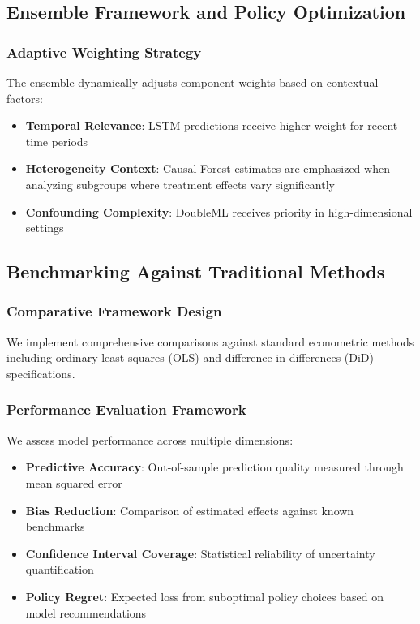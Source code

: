 \subsection{Ensemble Framework and Policy Optimization}\label{subsec:hybrid}

\subsubsection{Adaptive Weighting Strategy}
The ensemble dynamically adjusts component weights based on contextual factors:
\begin{itemize}
    \item \textbf{Temporal Relevance}: LSTM predictions receive higher weight for recent time periods
    \item \textbf{Heterogeneity Context}: Causal Forest estimates are emphasized when analyzing subgroups where treatment effects vary significantly
    \item \textbf{Confounding Complexity}: DoubleML receives priority in high-dimensional settings
\end{itemize}

\subsection{Benchmarking Against Traditional Methods}\label{subsec:benchmark}

\subsubsection{Comparative Framework Design}
We implement comprehensive comparisons against standard econometric methods including ordinary least squares (OLS) and difference-in-differences (DiD) specifications.

\subsubsection{Performance Evaluation Framework}
We assess model performance across multiple dimensions:
\begin{itemize}
    \item \textbf{Predictive Accuracy}: Out-of-sample prediction quality measured through mean squared error
    \item \textbf{Bias Reduction}: Comparison of estimated effects against known benchmarks
    \item \textbf{Confidence Interval Coverage}: Statistical reliability of uncertainty quantification
    \item \textbf{Policy Regret}: Expected loss from suboptimal policy choices based on model recommendations
\end{itemize}


